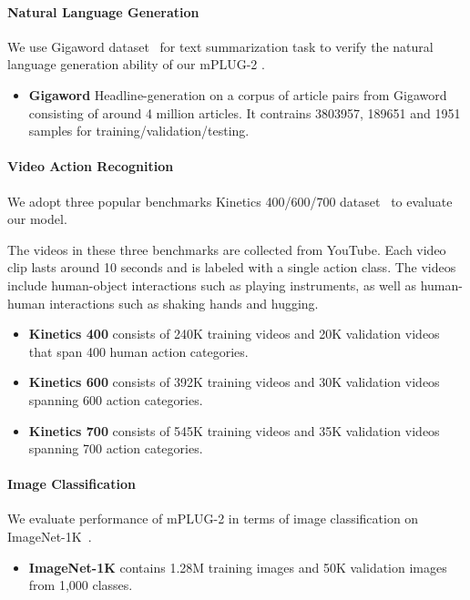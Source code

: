 \documentclass{article}
\theoremstyle{plain}
\theoremstyle{definition}
\theoremstyle{remark}
\newcommand{\modelname}{mPLUG-2 }
\begin{document}
\paragraph{Natural Language Generation}
We use Gigaword dataset~\citep{Rush2015ANA} for text summarization task to verify the natural language generation ability of our \modelname.

\begin{itemize}
    \item \textbf{Gigaword} Headline-generation on a corpus of article pairs from Gigaword consisting of around 4 million articles. It contrains 3803957, 189651 and 1951 samples for training/validation/testing.
\end{itemize}

\paragraph{Video Action Recognition}
We adopt three popular benchmarks Kinetics 400/600/700 dataset~\citep{Kay2017Kinetics} to evaluate our model.

The videos in these three benchmarks are collected from YouTube. Each video clip lasts around 10 seconds and is labeled with a single action class. The videos include human-object interactions such as playing instruments, as well as human-human interactions such as shaking hands and hugging. 

\begin{itemize}
    \item \textbf{Kinetics 400} consists of 240K training videos and 20K validation videos that span 400 human action categories.
    \item \textbf{Kinetics 600} consists of 392K training videos and 30K validation videos spanning 600 action categories.
    \item \textbf{Kinetics 700} consists of 545K training videos and 35K validation videos spanning 700 action categories.
\end{itemize}


\paragraph{Image Classification}
We evaluate performance of \modelname in terms of image classification on ImageNet-1K~\citep{imagenet}.

\begin{itemize}
    \item \textbf{ImageNet-1K} contains 1.28M training images and 50K validation images from 1,000 classes.
\end{itemize}
\end{document}
